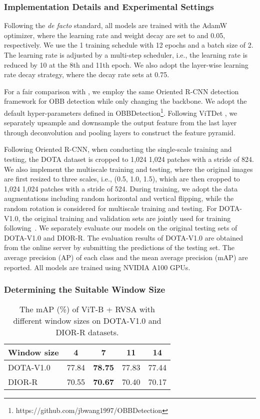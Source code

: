\documentclass[10pt, journal,twoside]{IEEEtran}
\begin{document}
\subsubsection{Implementation Details and Experimental Settings}
Following the \textit{de facto} standard, all models are trained with the AdamW \cite{adamw} optimizer, where the learning rate and weight decay are set to  and 0.05, respectively. We use the 1 training schedule with 12 epochs and a batch size of 2. The learning rate is adjusted by a multi-step scheduler, i.e., the learning rate is reduced by 10 at the 8th and 11th epoch. We also adopt the layer-wise learning rate decay strategy, where the decay rate sets at 0.75.
 
For a fair comparison with \cite{wang_rsp_2022}, we employ the same Oriented R-CNN \cite{orcn} detection framework for OBB detection while only changing the backbone. We adopt the default hyper-parameters defined in OBBDetection\footnote{https://github.com/jbwang1997/OBBDetection}. Following ViTDet \cite{vitdet}, we separately upsample and downsample the output feature from the last layer through deconvolution and pooling layers to construct the feature pyramid.
 
Following Oriented R-CNN, when conducting the single-scale training and testing, the DOTA dataset is cropped to 1,024  1,024 patches with a stride of 824. We also implement the multiscale training and testing, where the original images are first resized to three scales, i.e., (0.5, 1.0, 1.5), which are then cropped to 1,024  1,024 patches with a stride of 524. During training, we adopt the data augmentations including random horizontal and vertical flipping, while the random rotation is considered for multiscale training and testing. For DOTA-V1.0, the original training and validation sets are jointly used for training following~\cite{wang_rsp_2022}. We separately evaluate our models on the original testing sets of DOTA-V1.0 and DIOR-R. The evaluation results of DOTA-V1.0 are obtained from the online server by submitting the predictions of the testing set. The average precision (AP) of each class and the mean average precision (mAP) are reported. All models are trained using NVIDIA A100 GPUs.

\subsubsection{Determining the Suitable Window Size}
\begin{table}[t]
  \scriptsize
  \caption{The mAP (\%) of ViT-B + RVSA with different window sizes on DOTA-V1.0 and DIOR-R datasets.}
  \newcommand{\tabincell}[2]{\begin{tabular}{@{}#1@{}}#2\end{tabular}}
  \centering
  \begin{tabular}{l|cccc}
  \hline
  Window size  & 4 & 7 & 11 & 14 \\
  \hline
  DOTA-V1.0 & 77.84 & \bfseries 78.75 & 77.83 & 77.44 \\
  DIOR-R & 70.55 &  \bfseries 70.67 & 70.40 & 70.17 \\
  \hline
\end{tabular}
  \label{window_size}
\end{table}
\end{document}

